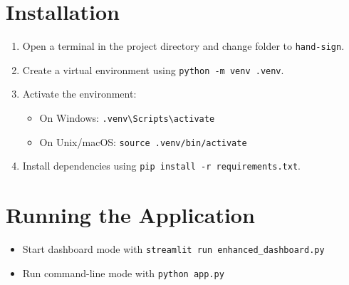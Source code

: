 \documentclass[12pt,a4paper]{report}
\begin{document}
\section{Installation}

\begin{enumerate}
    \item Open a terminal in the project directory and change folder to \texttt{hand-sign}.
    \item Create a virtual environment using \texttt{python -m venv .venv}.
    \item Activate the environment:
    \begin{itemize}
        \item On Windows: \texttt{.venv\textbackslash Scripts\textbackslash activate}
        \item On Unix/macOS: \texttt{source .venv/bin/activate}
    \end{itemize}
    \item Install dependencies using \texttt{pip install -r requirements.txt}.
\end{enumerate}

\section{Running the Application}

\begin{itemize}
    \item Start dashboard mode with \texttt{streamlit run enhanced_dashboard.py}
    \item Run command-line mode with \texttt{python app.py}
\end{itemize}
\end{document}
